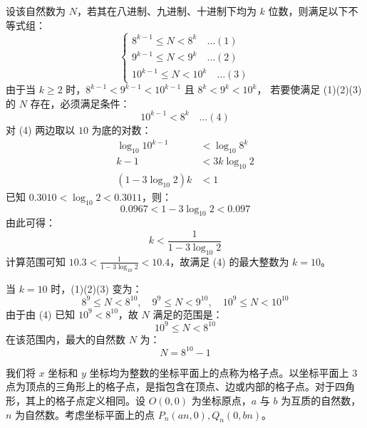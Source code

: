 \begin{questions}
\begin{solution}
    设该自然数为 $N$，若其在八进制、九进制、十进制下均为 $k$ 位数，则满足以下不等式组：
    \[ \begin{cases} 8^{k-1} \le N < 8^k \quad \dots (1) \\ 9^{k-1} \le N < 9^k \quad \dots (2) \\ 10^{k-1} \le N < 10^k \quad \dots (3) \end{cases}  \]
    由于当 $k \ge 2$ 时，$8^{k-1} < 9^{k-1} < 10^{k-1}$ 且 $8^k < 9^k < 10^k$，
    若要使满足 (1)(2)(3) 的 $N$ 存在，必须满足条件：
    \[ 10^{k-1} < 8^k \quad \dots (4)  \]
    对 (4) 两边取以 $10$ 为底的对数：
    \begin{align*}
        \log_{10} 10^{k-1} &< \log_{10} 8^k \\
        k-1 &< 3k \log_{10} 2 \\
        (1 - 3\log_{10} 2)k &< 1 
    \end{align*}
    已知 $0.3010 < \log_{10} 2 < 0.3011$，则：
    \[ 0.0967 < 1 - 3\log_{10} 2 < 0.097  \]
    由此可得：
    \[ k < \frac{1}{1 - 3\log_{10} 2}  \]
    计算范围可知 $10.3 < \frac{1}{1 - 3\log_{10} 2} < 10.4$，故满足 (4) 的最大整数为 $k = 10$。
    
    当 $k = 10$ 时，(1)(2)(3) 变为：
    \[ 8^9 \le N < 8^{10}, \quad 9^9 \le N < 9^{10}, \quad 10^9 \le N < 10^{10}  \]
    由于由 (4) 已知 $10^9 < 8^{10}$，故 $N$ 满足的范围是：
    \[ 10^9 \le N < 8^{10}  \]
    在该范围内，最大的自然数 $N$ 为：
    \[ N = 8^{10} - 1  \]
\end{solution}

\question
我们将 $x$ 坐标和 $y$ 坐标均为整数的坐标平面上的点称为格子点。以坐标平面上 $3$ 点为顶点的三角形上的格子点，是指包含在顶点、边或内部的格子点。对于四角形，其上的格子点定义相同。设 $O(0, 0)$ 为坐标原点，$a$ 与 $b$ 为互质的自然数，$n$ 为自然数。考虑坐标平面上的点 $P_n(an, 0), Q_n(0, bn)$。
\end{questions}
